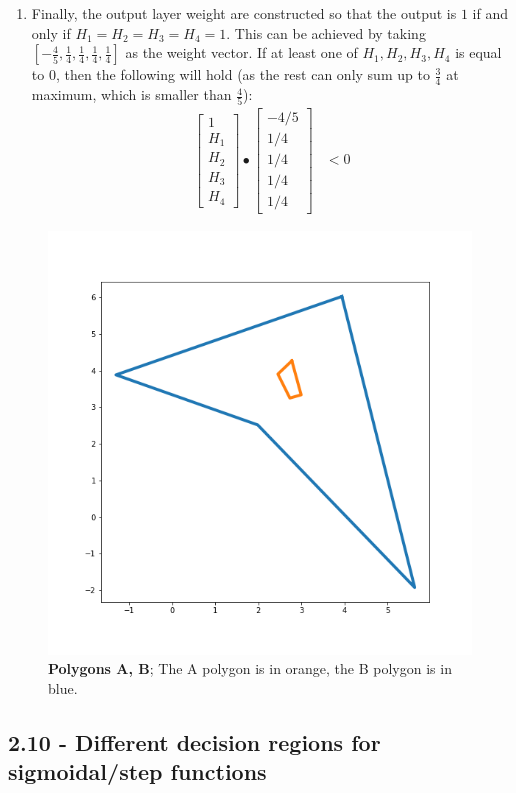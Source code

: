 \documentclass[12pt]{article}
\begin{document}
\begin{enumerate}
\item Finally, the output layer weight are constructed so that the output is $1$ if and only if $H_1 = H_2 = H_3 = H_4 = 1$. This can be achieved by taking $[-\frac{4}{5}, \frac{1}{4}, \frac{1}{4}, \frac{1}{4},\frac{1}{4}]$ as the weight vector. If at least one of $H_1, H_2, H_3, H_4$ is equal to $0$, then the following will hold (as the rest can only sum up to $\frac{3}{4}$ at maximum, which is smaller than $\frac{4}{5}$):
\begin{align}
     \begin{bmatrix}
           1 \\
           H_1 \\
           H_2 \\
           H_3 \\
           H_4 
         \end{bmatrix} \bullet \begin{bmatrix}
           -4/5 \\
           1/4\\
           1/4\\
           1/4\\
           1/4
         \end{bmatrix} & < 0
\end{align}
\end{enumerate}

\begin{figure}[!htb]
\centering
\includegraphics[scale=0.8]{task2_polygons.png}
\caption{\textbf{Polygons A, B}; The A polygon is in orange, the B polygon is in blue.}
\label{polygons}
\end{figure}

\newpage

\subsection*{2.10 - Different decision regions for sigmoidal/step functions}
\end{document}
